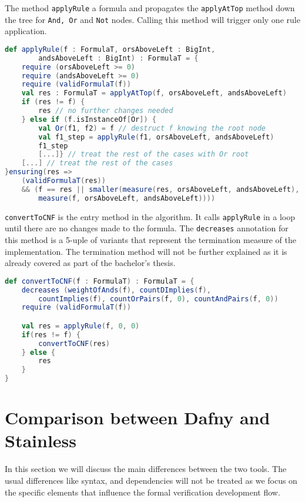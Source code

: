The method \texttt{applyRule} a formula and propagates the \texttt{applyAtTop} method
down the tree for \texttt{And, Or} and \texttt{Not} nodes. Calling this method will
trigger only one rule application.

\begin{lstlisting}[language=Scala, caption={Method \texttt{applyRule}}]
def applyRule(f : FormulaT, orsAboveLeft : BigInt, 
        andsAboveLeft : BigInt) : FormulaT = {
    require (orsAboveLeft >= 0)
    require (andsAboveLeft >= 0)
    require (validFormulaT(f))
    val res : FormulaT = applyAtTop(f, orsAboveLeft, andsAboveLeft)
    if (res != f) {
        res // no further changes needed
    } else if (f.isInstanceOf[Or]) {
        val Or(f1, f2) = f // destruct f knowing the root node
        val f1_step = applyRule(f1, orsAboveLeft, andsAboveLeft)
        f1_step
        [...]} // treat the rest of the cases with Or root
    [...] // treat the rest of the cases
}ensuring(res =>
    (validFormulaT(res))
    && (f == res || smaller(measure(res, orsAboveLeft, andsAboveLeft),
        measure(f, orsAboveLeft, andsAboveLeft))))
\end{lstlisting}

\texttt{convertToCNF} is the entry method in the algorithm. It calls \texttt{applyRule}
in a loop until there are no changes made to the formula. The \texttt{decreases} annotation
for this method is a 5-uple of variants that represent the termination measure of the implementation.
The termination method will not be further explained as it is already covered as part
of the bachelor's thesis\cite{licenta}.

\begin{lstlisting}[language=Scala, caption={Method \texttt{applyRule}}]
def convertToCNF(f : FormulaT) : FormulaT = {
    decreases (weightOfAnds(f), countDImplies(f), 
        countImplies(f), countOrPairs(f, 0), countAndPairs(f, 0))
    require (validFormulaT(f))

    val res = applyRule(f, 0, 0)
    if(res != f) {
        convertToCNF(res)
    } else {
        res
    }
}
\end{lstlisting}


\section{Comparison between Dafny and Stainless}

In this section we will discuss the main differences between the two tools. The usual differences
like syntax, and dependencies will not be treated as we focus on the specific elements that influence
the formal verification development flow.


